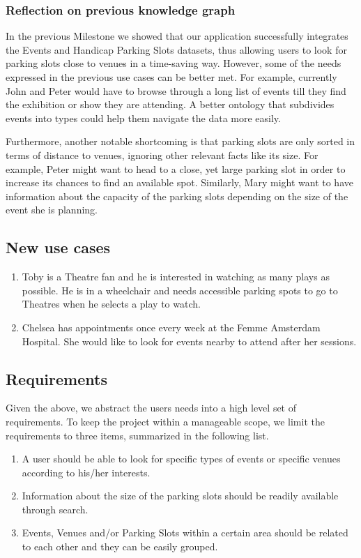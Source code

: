 \documentclass[runningheads,a4paper]{../../StyleFiles/llncs}
\begin{document}
\subsubsection{Reflection on previous knowledge graph} 
In the previous Milestone we showed that our application successfully integrates the Events and Handicap Parking Slots datasets, thus allowing users to look for parking slots close to venues in a time-saving way. However, some of the needs expressed in the previous use cases can be better met. For example, currently John and Peter would have to browse through a long list of events till they find the exhibition or show they are attending. A better ontology that subdivides events into types could help them navigate the data more easily. 

Furthermore, another notable shortcoming is that parking slots are only sorted in terms of distance to venues, ignoring other relevant facts like its size. For example, Peter might want to head to a close, yet large parking slot in order to increase its chances to find an available spot. Similarly, Mary might want to have information about the capacity of the parking slots depending on the size of the event she is planning.

\subsection{New use cases}
\begin{enumerate}
	\item Toby is a Theatre fan and he is interested in watching as many plays as possible. He is in a wheelchair and needs accessible parking spots to go to Theatres when he selects a play to watch. 
	\item Chelsea has appointments once every week at the Femme Amsterdam Hospital. She would like to look for events nearby to attend after her sessions. 
\end{enumerate}

\subsection{Requirements}
\label{requirements}
Given the above, we abstract the users needs into a high level set of requirements. To keep the project within a manageable scope, we limit the requirements to three items, summarized in the following list.

\begin{enumerate}
	\item A user should be able to look for specific types of events or specific venues according to his/her interests.
	\item Information about the size of the parking slots should be readily available through search. 
	\item Events, Venues and/or Parking Slots within a certain area should be related to each other and they can be easily grouped. 
\end{enumerate}
\end{document}

